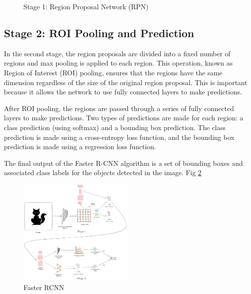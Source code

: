 \begin{figure}[ht]
  \centering
  \hfill
  \caption{Stage 1: Region Proposal Network (RPN)}
  \label{fig:faster_r_cnn_stage_1}
\end{figure}

\subsection{Stage 2: ROI Pooling and Prediction}
In the second stage, the region proposals are divided into a fixed number of regions and max pooling is applied to each region. This operation, known as Region of Interest (ROI) pooling, ensures that the regions have the same dimension regardless of the size of the original region proposal. This is important because it allows the network to use fully connected layers to make predictions.

After ROI pooling, the regions are passed through a series of fully connected layers to make predictions. Two types of predictions are made for each region: a class prediction (using softmax) and a bounding box prediction. The class prediction is made using a cross-entropy loss function, and the bounding box prediction is made using a regression loss function.

The final output of the Faster R-CNN algorithm is a set of bounding boxes and associated class labels for the objects detected in the image.
Fig \ref{fig:faster_r_cnn_structure}

\begin{figure}[H]
  \centering
  \includegraphics[width=0.5\textwidth]{images/faster_r_cnn/structure.png}
  \caption{Faster RCNN}
  \label{fig:faster_r_cnn_structure}
\end{figure}

